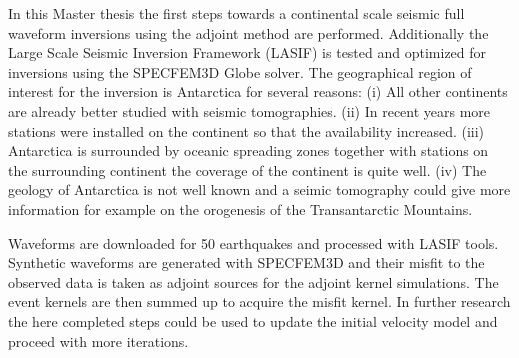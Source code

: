 
In this Master thesis the first steps towards a continental scale seismic full waveform inversions 
using the adjoint method are performed. Additionally the Large Scale Seismic Inversion Framework 
(LASIF) is tested and optimized for inversions using the SPECFEM3D Globe solver.
The geographical region of interest for the inversion is Antarctica for several reasons:
(i) All other continents are already better studied with seismic tomographies.
(ii) In recent years more stations were installed on the continent so that the availability increased.
(iii) Antarctica is surrounded by oceanic spreading zones together with stations on the surrounding 
continent the coverage of the continent is quite well.
(iv) The geology of Antarctica is not well known and a seimic tomography could give more information
for example on the orogenesis of the Transantarctic Mountains.

Waveforms are downloaded for 50 earthquakes and processed with LASIF tools. 
Synthetic waveforms are generated with SPECFEM3D and their misfit to the observed data is taken as
adjoint sources for the adjoint kernel simulations. 
The event kernels are then summed up to acquire the misfit kernel.
In further research the here completed steps could be used to update the initial velocity model and 
proceed with more iterations.

 




